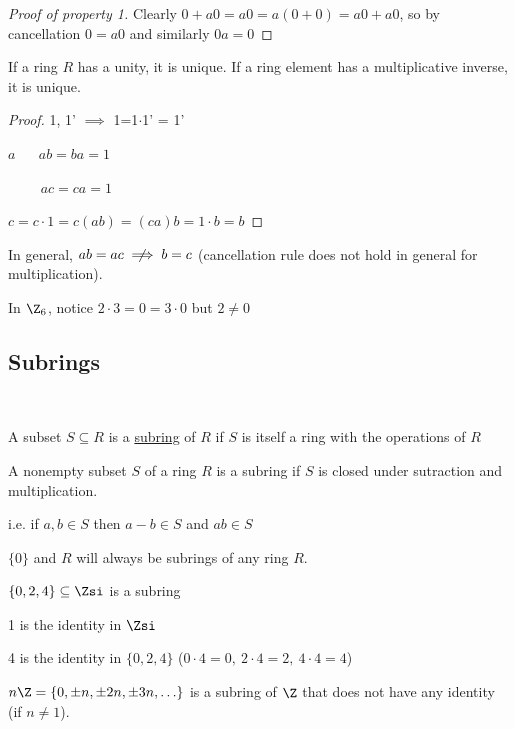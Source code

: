 \begin{proof}[Proof of property 1]
    Clearly \(0+a0 = a0 = a(0+0) = a0 + a0\), so by cancellation \(0=a0\) and similarly \(0a=0\)
\end{proof}

\begin{theorem}
  If a ring \(R\) has a unity, it is unique. If a ring element has a multiplicative inverse, it is unique.
\end{theorem}

\begin{proof}
1, 1' \(\implies\) 1=1\(\cdot\)1' = 1'

\(a\) \(\quad\) \(ab=ba = 1\)

\(\qquad\) \(ac=ca=1\)

\(c = c\cdot 1 = c(ab) = (ca)b = 1\cdot b = b\)
\end{proof}

\begin{warning}
In general, \(ab = ac \centernot\implies b=c\) (cancellation rule does not hold in general for multiplication).
\end{warning}

\begin{example}
  In \(\Z_6\), notice \(2\cdot 3 = 0 = 3\cdot 0\) but \(2\neq 0\)
\end{example}

\subsection{Subrings}\

\begin{definition}[Subring]
  A subset \(S\subseteq R\) is a \ul{subring} of \(R\) if \(S\) is itself a ring with the operations of \(R\)
\end{definition}

\begin{theorem}
  A nonempty subset \(S\) of a ring \(R\) is a subring if \(S\)  is closed under sutraction and multiplication.

  i.e. if \(a,b\in S\) then \(a-b\in S\) and \(ab \in S\)
\end{theorem}

\begin{example}
  \(\{0\}\) and \(R\) will always be subrings of any ring \(R\).
\end{example}

\begin{example}
  \(\{0,2,4\}\subseteq \Zsi\) is a subring

  1 is the identity in \(\Zsi\)

  4 is the identity in \(\{0,2,4\}\) (\(0\cdot 4 = 0,\ 2\cdot 4 = 2,\ 4\cdot 4 = 4\))
\end{example}

\begin{example}
  \(n\Z = \{0, \pm n, \pm 2n, \pm 3n,\ldots\}\) is a subring of \(\Z\) that does not have any identity (if \(n\neq 1\)).
\end{example}